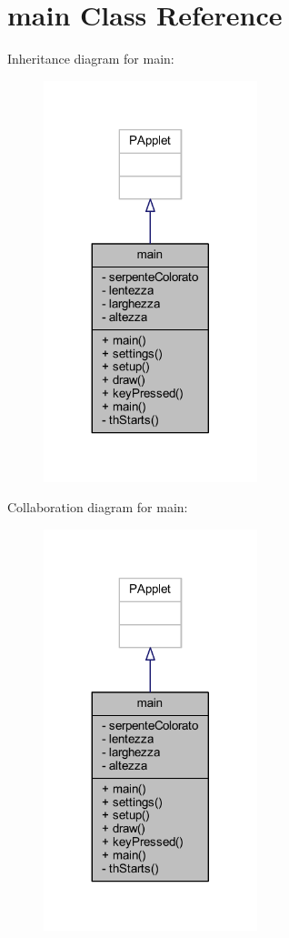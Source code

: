 \hypertarget{classmain}{}\section{main Class Reference}
\label{classmain}


Inheritance diagram for main\+:
\nopagebreak
\begin{figure}[H]
\begin{center}
\leavevmode
\includegraphics[width=176pt]{classmain__inherit__graph}
\end{center}
\end{figure}


Collaboration diagram for main\+:
\nopagebreak
\begin{figure}[H]
\begin{center}
\leavevmode
\includegraphics[width=176pt]{classmain__coll__graph}
\end{center}
\end{figure}
